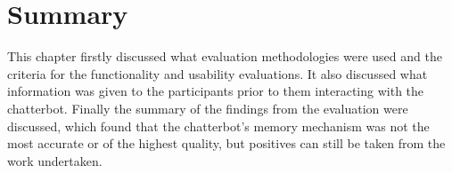 \section{Summary}
This chapter firstly discussed what evaluation methodologies were used and the criteria for the functionality and usability evaluations. It also discussed what information was given to the participants prior to them interacting with the chatterbot. Finally the summary of the findings from the evaluation were discussed, which found that the chatterbot's memory mechanism was not the most accurate or of the highest quality, but positives can still be taken from the work undertaken.
